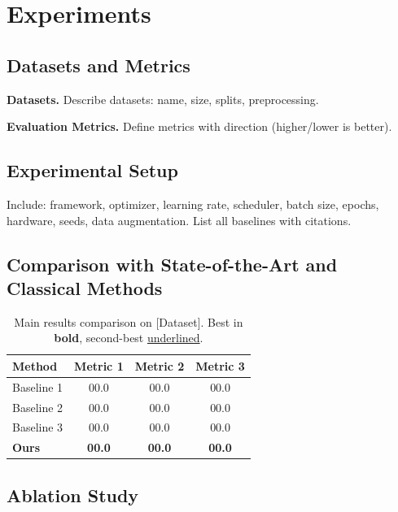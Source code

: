 \documentclass[10pt,twocolumn,letterpaper]{article}
\begin{document}
\section{Experiments}
\label{sec:experiments}

\subsection{Datasets and Metrics}
\label{sec:exp-data}

\textbf{Datasets.} Describe datasets: name, size, splits, preprocessing.

\textbf{Evaluation Metrics.} Define metrics with direction (higher/lower is better).

\subsection{Experimental Setup}
\label{sec:exp-setup}

Include: framework, optimizer, learning rate, scheduler, batch size, epochs,
hardware, seeds, data augmentation. List all baselines with citations.

\subsection{Comparison with State-of-the-Art and Classical Methods}
\label{sec:exp-main}

\begin{table}[t]
  \centering
  \caption{Main results comparison on [Dataset]. Best in \textbf{bold}, second-best \underline{underlined}.}
  \label{tab:main-results}
  \begin{tabular}{lccc}
    \toprule
    \textbf{Method} & \textbf{Metric 1} & \textbf{Metric 2} & \textbf{Metric 3} \\
    \midrule
    Baseline 1 \cite{ref1} & 00.0 & 00.0 & 00.0 \\
    Baseline 2 \cite{ref2} & 00.0 & 00.0 & 00.0 \\
    Baseline 3 \cite{ref3} & 00.0 & 00.0 & 00.0 \\
    \textbf{Ours}          & \textbf{00.0} & \textbf{00.0} & \textbf{00.0} \\
    \bottomrule
  \end{tabular}
\end{table}

\subsection{Ablation Study}
\label{sec:exp-ablation}
\end{document}
